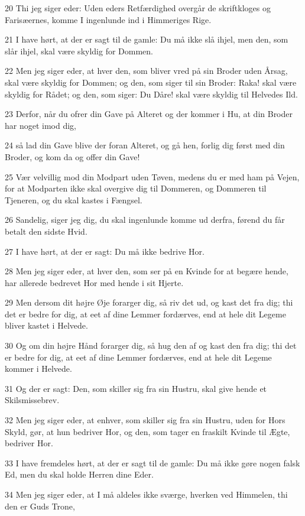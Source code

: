 \par 20 Thi jeg siger eder: Uden eders Retfærdighed overgår de skriftkloges og Farisæernes, komme I ingenlunde ind i Himmeriges Rige.
\par 21 I have hørt, at der er sagt til de gamle: Du må ikke slå ihjel, men den, som slår ihjel, skal være skyldig for Dommen.
\par 22 Men jeg siger eder, at hver den, som bliver vred på sin Broder uden Årsag, skal være skyldig for Dommen; og den, som siger til sin Broder: Raka! skal være skyldig for Rådet; og den, som siger: Du Dåre! skal være skyldig til Helvedes Ild.
\par 23 Derfor, når du ofrer din Gave på Alteret og der kommer i Hu, at din Broder har noget imod dig,
\par 24 så lad din Gave blive der foran Alteret, og gå hen, forlig dig først med din Broder, og kom da og offer din Gave!
\par 25 Vær velvillig mod din Modpart uden Tøven, medens du er med ham på Vejen, for at Modparten ikke skal overgive dig til Dommeren, og Dommeren til Tjeneren, og du skal kastes i Fængsel.
\par 26 Sandelig, siger jeg dig, du skal ingenlunde komme ud derfra, førend du får betalt den sidste Hvid.
\par 27 I have hørt, at der er sagt: Du må ikke bedrive Hor.
\par 28 Men jeg siger eder, at hver den, som ser på en Kvinde for at begære hende, har allerede bedrevet Hor med hende i sit Hjerte.
\par 29 Men dersom dit højre Øje forarger dig, så riv det ud, og kast det fra dig; thi det er bedre for dig, at eet af dine Lemmer fordærves, end at hele dit Legeme bliver kastet i Helvede.
\par 30 Og om din højre Hånd forarger dig, så hug den af og kast den fra dig; thi det er bedre for dig, at eet af dine Lemmer fordærves, end at hele dit Legeme kommer i Helvede.
\par 31 Og der er sagt: Den, som skiller sig fra sin Hustru, skal give hende et Skilsmissebrev.
\par 32 Men jeg siger eder, at enhver, som skiller sig fra sin Hustru, uden for Hors Skyld, gør, at hun bedriver Hor, og den, som tager en fraskilt Kvinde til Ægte, bedriver Hor.
\par 33 I have fremdeles hørt, at der er sagt til de gamle: Du må ikke gøre nogen falsk Ed, men du skal holde Herren dine Eder.
\par 34 Men jeg siger eder, at I må aldeles ikke sværge, hverken ved Himmelen, thi den er Guds Trone,
